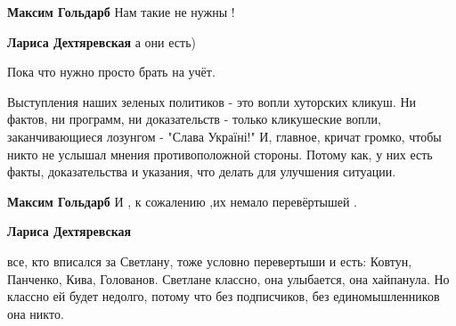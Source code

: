 \begin{itemize}
\begin{itemize}
\textbf{Максим Гольдарб} Нам такие не нужны !

 
\textbf{Лариса Дехтяревская} а они есть)

 
Пока что нужно просто брать на учёт.

 

Выступления наших зеленых политиков - это вопли хуторских кликуш. Ни фактов, ни
программ, ни доказательств - только кликушеские вопли, заканчивающиеся лозунгом
- "Слава Україні!" И, главное, кричат громко, чтобы никто не услышал мнения
противоположной стороны. Потому как, у них есть факты, доказательства и
указания, что делать для улучшения ситуации.


 
\textbf{Максим Гольдарб} И , к сожалению ,их немало перевёртышей .

 
\textbf{Лариса Дехтяревская} 

все, кто вписался за Светлану, тоже условно перевертыши и есть: Ковтун,
Панченко, Кива, Голованов. Светлане классно, она улыбается, она хайпанула. Но
классно ей будет недолго, потому что без подписчиков, без единомышленников она
никто.



\end{itemize}
\end{itemize}
